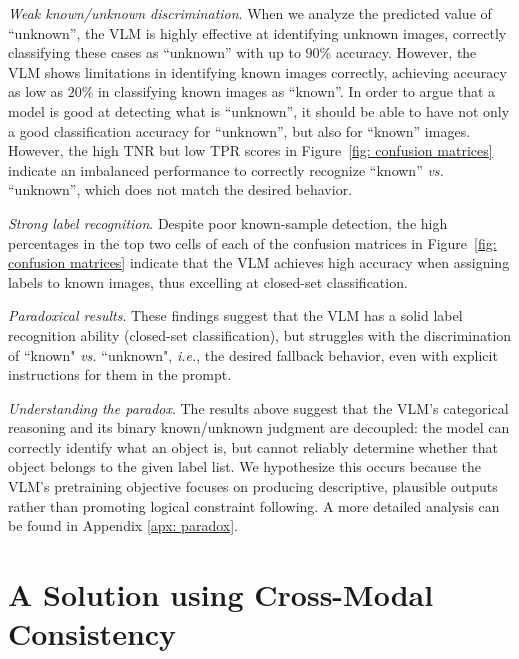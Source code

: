 \documentclass[10pt]{article} %
\begin{document}
{\em Weak known/unknown discrimination}. When we analyze the predicted value of ``unknown'', the VLM is highly effective at identifying unknown images, correctly classifying these cases as ``unknown'' with up to $90\%$ accuracy.
However, the VLM shows limitations in identifying known images correctly, achieving accuracy as low as $20\%$ in classifying known images as ``known''. 
In order to argue that a model is good at detecting what is ``unknown'', it should be able to have not only a good classification accuracy for ``unknown'', but also for ``known'' images.
However, the high TNR but low TPR scores in Figure~\ref{fig: confusion matrices} indicate an imbalanced performance to correctly recognize ``known'' {\em vs.} ``unknown'', which does not match the desired behavior.

{\em Strong label recognition}. Despite poor known-sample detection, the high percentages in the top two cells of each of the confusion matrices in Figure~\ref{fig: confusion matrices} indicate that the VLM achieves high accuracy when assigning labels to known images, thus excelling at closed-set classification.

{\em Paradoxical results}. These findings suggest that the VLM has a solid label recognition ability (closed-set classification), but struggles with the discrimination of ``known" {\em vs.} ``unknown", {\em i.e.}, the desired fallback behavior, even with explicit instructions for them in the prompt.

{\em Understanding the paradox}. The results above suggest that the VLM's categorical reasoning and its binary known/unknown judgment are decoupled: the model can correctly identify what an object is, but cannot reliably determine whether that object belongs to the given label list. We hypothesize this occurs because the VLM's pretraining objective focuses on producing descriptive, plausible outputs rather than promoting logical constraint following. A more detailed analysis can be found in Appendix \ref{apx: paradox}.

\section{A Solution using Cross-Modal Consistency}
\label{sec - method}
\end{document}
